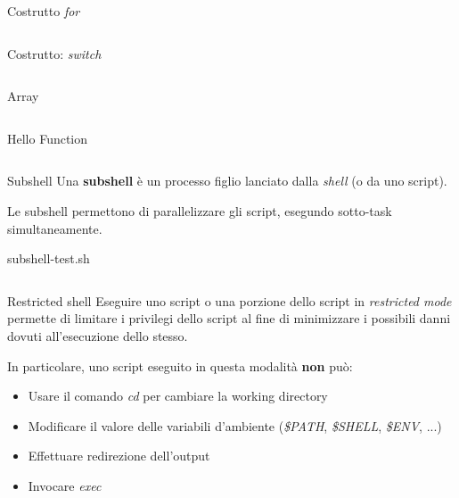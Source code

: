 \documentclass{beamer}
\begin{document}
    \begin{frame}{Costrutto \textit{for}}
        \inputminted[fontsize=\scriptsize]{bash}{script/for-example.sh}
    \end{frame}

    \begin{frame}{Costrutto: \textit{switch}}
        \inputminted[fontsize=\scriptsize]{bash}{script/switch-example.sh}
    \end{frame}

    \begin{frame}[fragile]{Array}
        \inputminted[fontsize=\small]{bash}{script/array-example.sh}
    \end{frame}

    \begin{frame}{Hello Function}
        \inputminted[fontsize=\small]{bash}{script/hello-function.sh}
    \end{frame}

    \begin{frame}{Subshell}
        Una \textbf{subshell} è un processo figlio lanciato dalla \textit{shell} (o da uno script).

        Le subshell permettono di parallelizzare gli script, esegundo sotto-task simultaneamente.
        
        \begin{exampleblock}{subshell-test.sh}
            \inputminted[fontsize=\small]{bash}{script/subshell-test.sh}
        \end{exampleblock}
    \end{frame}

    \begin{frame}{Restricted shell}
        Eseguire uno script o una porzione dello script in \textit{restricted mode}
        permette di limitare i privilegi dello script al fine
        di minimizzare i possibili danni dovuti all'esecuzione dello stesso.

        \vspace{0.5cm}

        In particolare, uno script eseguito in questa modalità \textbf{non} può:

        \begin{itemize}
            \item Usare il comando \textit{cd} per cambiare la working directory
            \item Modificare il valore delle variabili d'ambiente (\textit{\$PATH}, \textit{\$SHELL}, \textit{\$ENV}, ...)
            \item Effettuare redirezione dell'output
            \item Invocare \textit{exec}
        \end{itemize}
    \end{frame}
\end{document}
